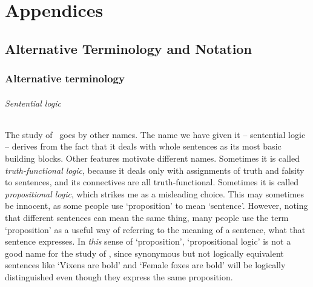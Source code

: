 
\appendix %

\part*{Appendices}


\chapter{Alternative Terminology and Notation}\label{app.notation}

\section*{Alternative terminology}
\paragraph{Sentential logic} The study of \TFL\ goes by other names. The name we have given it – sentential logic – derives from the fact that it deals with whole sentences as its most basic building blocks. Other features motivate different names.  Sometimes it is called \emph{truth-functional logic}, because it deals only with assignments of truth and falsity to sentences, and its connectives are all truth-functional. Sometimes it is called \emph{propositional logic}, which strikes me as a misleading choice. This may sometimes be innocent, as some people  use `proposition' to mean `sentence'. However, noting that different sentences can mean the same thing, many people use the term  `proposition' as a useful way of referring to the meaning of a sentence, what that sentence expresses. In \emph{this} sense of `proposition', `propositional logic' is not a good name for the study of \TFL, since synonymous but not logically equivalent sentences like `Vixens are bold' and `Female foxes are bold' will be logically distinguished even though they express the same proposition.



